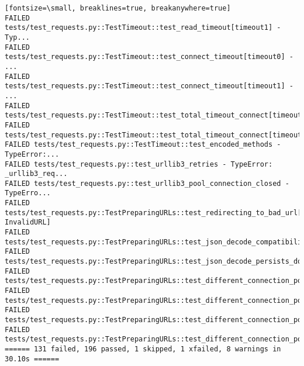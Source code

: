 \begin{verbatim}[fontsize=\small, breaklines=true, breakanywhere=true]
FAILED tests/test_requests.py::TestTimeout::test_read_timeout[timeout1] - Typ...
FAILED tests/test_requests.py::TestTimeout::test_connect_timeout[timeout0] - ...
FAILED tests/test_requests.py::TestTimeout::test_connect_timeout[timeout1] - ...
FAILED tests/test_requests.py::TestTimeout::test_total_timeout_connect[timeout0]
FAILED tests/test_requests.py::TestTimeout::test_total_timeout_connect[timeout1]
FAILED tests/test_requests.py::TestTimeout::test_encoded_methods - TypeError:...
FAILED tests/test_requests.py::test_urllib3_retries - TypeError: _urllib3_req...
FAILED tests/test_requests.py::test_urllib3_pool_connection_closed - TypeErro...
FAILED tests/test_requests.py::TestPreparingURLs::test_redirecting_to_bad_url[http://:1-InvalidURL]
FAILED tests/test_requests.py::TestPreparingURLs::test_json_decode_compatibility
FAILED tests/test_requests.py::TestPreparingURLs::test_json_decode_persists_doc_attr
FAILED tests/test_requests.py::TestPreparingURLs::test_different_connection_pool_for_tls_settings_verify_True
FAILED tests/test_requests.py::TestPreparingURLs::test_different_connection_pool_for_tls_settings_verify_bundle_expired_cert
FAILED tests/test_requests.py::TestPreparingURLs::test_different_connection_pool_for_tls_settings_verify_bundle_unexpired_cert
FAILED tests/test_requests.py::TestPreparingURLs::test_different_connection_pool_for_mtls_settings
====== 131 failed, 196 passed, 1 skipped, 1 xfailed, 8 warnings in 30.10s ======
\end{verbatim}


